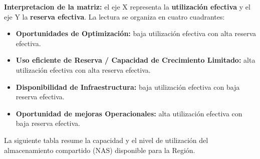 \documentclass[11pt,a4paper]{article}
\begin{document}
\begin{table}[H]
\centering
\caption{Métricas de Capacidad Efectiva Disponible de la Región 9 (Sobre Capacidad Neta)}
\label{tab:region9_matrix_values}
\end{table}


\textbf{Interpretacion de la matriz:} el eje X representa la \textbf{utilización efectiva} y el eje Y la \textbf{reserva efectiva}. La lectura se organiza en cuatro cuadrantes:
\begin{itemize}
    \item \textbf{Oportunidades de Optimización:} baja utilización efectiva con alta reserva efectiva.
    \item \textbf{Uso eficiente de Reserva / Capacidad de Crecimiento Limitado:} alta utilización efectiva con alta reserva efectiva.
    \item \textbf{Disponibilidad de Infraestructura:} baja utilización efectiva con baja reserva efectiva.
    \item \textbf{Oportunidad de mejoras Operacionales:} alta utilización efectiva con baja reserva efectiva.
\end{itemize}


\noindent La siguiente tabla resume la capacidad y el nivel de utilización del almacenamiento compartido (NAS) disponible para la Región.
\end{document}

